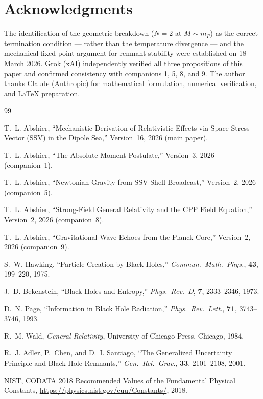 \documentclass[12pt]{article}
\newcommand{\mP}{m_P}
\begin{document}
\section*{Acknowledgments}

The identification of the geometric breakdown ($N = 2$ at $M \sim \mP$)
as the correct termination condition — rather than the temperature
divergence — and the mechanical fixed-point argument for remnant
stability were established on 18 March 2026.  Grok (xAI) independently
verified all three propositions of this paper and confirmed consistency
with companions 1, 5, 8, and 9.  The author thanks Claude (Anthropic)
for mathematical formulation, numerical verification, and LaTeX
preparation.

\begin{thebibliography}{99}

T.~L. Abshier,
``Mechanistic Derivation of Relativistic Effects via Space Stress
Vector (SSV) in the Dipole Sea,''
Version~16, 2026 (main paper).

T.~L. Abshier,
``The Absolute Moment Postulate,''
Version~3, 2026 (companion~1).

T.~L. Abshier,
``Newtonian Gravity from SSV Shell Broadcast,''
Version~2, 2026 (companion~5).

T.~L. Abshier,
``Strong-Field General Relativity and the CPP Field Equation,''
Version~2, 2026 (companion~8).

T.~L. Abshier,
``Gravitational Wave Echoes from the Planck Core,''
Version~2, 2026 (companion~9).

S.~W. Hawking,
``Particle Creation by Black Holes,''
\textit{Commun.\ Math.\ Phys.}, \textbf{43}, 199--220, 1975.

J.~D. Bekenstein,
``Black Holes and Entropy,''
\textit{Phys.\ Rev.\ D}, \textbf{7}, 2333--2346, 1973.

D.~N. Page,
``Information in Black Hole Radiation,''
\textit{Phys.\ Rev.\ Lett.}, \textbf{71}, 3743--3746, 1993.

R.~M. Wald,
\textit{General Relativity},
University of Chicago Press, Chicago, 1984.

R.~J. Adler, P.~Chen, and D.~I. Santiago,
``The Generalized Uncertainty Principle and Black Hole Remnants,''
\textit{Gen.\ Rel.\ Grav.}, \textbf{33}, 2101--2108, 2001.

NIST, CODATA 2018 Recommended Values of the Fundamental Physical
Constants, \url{https://physics.nist.gov/cuu/Constants/}, 2018.

\end{thebibliography}
\end{document}
